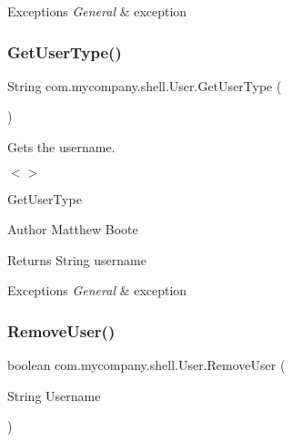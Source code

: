 \begin{DoxyExceptions}{Exceptions}
{\em General} & exception \\
\hline
\end{DoxyExceptions}
\mbox{\label{group__TechnicalDetails_gaba3042d4abc0586fdb28bc7692ad300d}} 
\subsubsection{\texorpdfstring{Get\+User\+Type()}{GetUserType()}}
{\footnotesize\ttfamily String com.\+mycompany.\+shell.\+User.\+Get\+User\+Type (\begin{DoxyParamCaption}{ }\end{DoxyParamCaption})\hspace{0.3cm}{\ttfamily [inline]}}



Gets the username. 

$<$$>$

Get\+User\+Type

\begin{DoxyAuthor}{Author}
Matthew Boote
\end{DoxyAuthor}
\begin{DoxyReturn}{Returns}
String username
\end{DoxyReturn}

\begin{DoxyExceptions}{Exceptions}
{\em General} & exception \\
\hline
\end{DoxyExceptions}
\mbox{\label{group__TechnicalDetails_ga87fcb60481678e35850283b557bba02d}} 
\subsubsection{\texorpdfstring{Remove\+User()}{RemoveUser()}}
{\footnotesize\ttfamily boolean com.\+mycompany.\+shell.\+User.\+Remove\+User (\begin{DoxyParamCaption}\item[{String}]{Username }\end{DoxyParamCaption})\hspace{0.3cm}{\ttfamily [inline]}}



